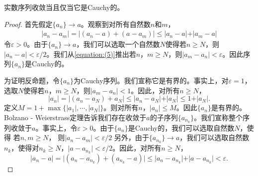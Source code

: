 \documentclass[lang=cn,newtx,10pt,scheme=chinese]{../Template/elegantbook}
\begin{document}
\begin{theorem}[实数序列的Cauchy收敛准则]\label{theorem:实数序列的Cauchy收敛准则}
  实数序列收敛当且仅当它是Cauchy的。
\end{theorem}
\begin{proof}
  首先假定\(\{a_n\}\to a\)。观察到对所有自然数\(n\)和\(m\)，
  \begin{align}\label{equation:(5)}
    \vert a_n - a_m\vert=\vert(a_n - a)+(a - a_m)\vert\leqslant\vert a_n - a\vert+\vert a_m - a\vert
  \end{align}
  令\(\varepsilon>0\)。由于\(\{a_n\}\to a\)，我们可以选取一个自然数\(N\)使得若\(n\geqslant N\)，则\(\vert a_n - a\vert<\varepsilon/2\)。我们从\eqref{equation:(5)}推出若\(n\)，\(m\geqslant N\)，则\(\vert a_m - a_n\vert<\varepsilon\)。因此序列\(\{a_n\}\)是Cauchy的。
  
  为证明反命题，令\(\{a_n\}\)为Cauchy序列。我们宣称它是有界的。事实上，对\(\varepsilon = 1\)，选取\(N\)使得若\(n\)，\(m\geqslant N\)，则\(\vert a_m - a_n\vert<1\)。因此，对所有\(n\geqslant N\)，
  \[\vert a_n\vert=\vert(a_n - a_N)+a_N\vert\leqslant\vert a_n - a_N\vert+\vert a_N\vert\leqslant1+\vert a_N\vert.\]
  定义\(M = 1+\max\{\vert a_1\vert, \cdots, \vert a_N\vert\}\)。则对所有\(n\)，\(\vert a_n\vert\leqslant M\)。因此\(\{a_n\}\)是有界的。Bolzano - Weierstrass定理告诉我们存在收敛于\(a\)的子序列\(\{a_{n_k}\}\)。我们宣称整个序列收敛于\(a\)。事实上，令\(\varepsilon>0\)。由于\(\{a_n\}\)是Cauchy的，我们可以选取自然数\(N\)，使得
  若\(n,m\geqslant N\)， 则\(\vert a_n - a_m\vert<\varepsilon/2\)
  另外，由于\(\{a_{n_k}\}\to a\)，我们可以选取自然数\(n_k\)，使得对\(n_k\geqslant N\)，\(\vert a - a_{n_k}\vert<\varepsilon/2\)。因此，对所有\(n\geqslant N\)，
  \[\vert a_n - a\vert=\vert(a_n - a_{n_k})+(a_{n_k}-a)\vert\leqslant\vert a_n - a_{n_k}\vert+\vert a - a_{n_k}\vert<\varepsilon.\]

\end{proof}
\end{document}
